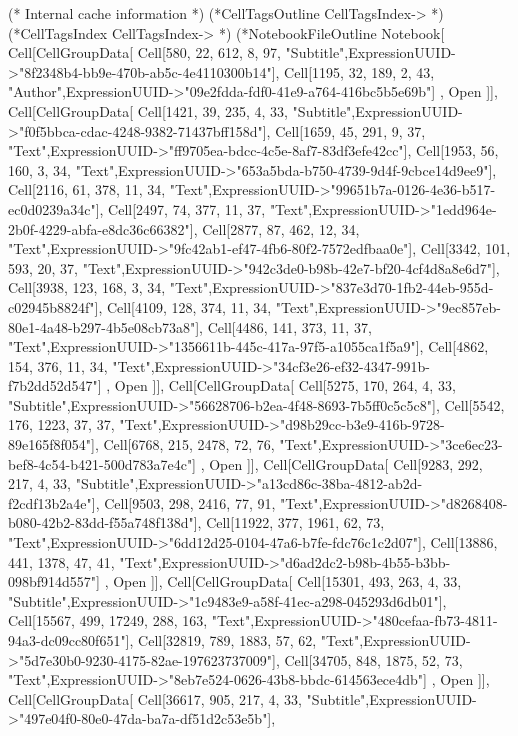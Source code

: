 (* Internal cache information *)
(*CellTagsOutline
CellTagsIndex->{}
*)
(*CellTagsIndex
CellTagsIndex->{}
*)
(*NotebookFileOutline
Notebook[{
Cell[CellGroupData[{
Cell[580, 22, 612, 8, 97, "Subtitle",ExpressionUUID->"8f2348b4-bb9e-470b-ab5c-4e4110300b14"],
Cell[1195, 32, 189, 2, 43, "Author",ExpressionUUID->"09e2fdda-fdf0-41e9-a764-416bc5b5e69b"]
}, Open  ]],
Cell[CellGroupData[{
Cell[1421, 39, 235, 4, 33, "Subtitle",ExpressionUUID->"f0f5bbca-cdac-4248-9382-71437bff158d"],
Cell[1659, 45, 291, 9, 37, "Text",ExpressionUUID->"ff9705ea-bdcc-4c5e-8af7-83df3efe42cc"],
Cell[1953, 56, 160, 3, 34, "Text",ExpressionUUID->"653a5bda-b750-4739-9d4f-9cbce14d9ee9"],
Cell[2116, 61, 378, 11, 34, "Text",ExpressionUUID->"99651b7a-0126-4e36-b517-ec0d0239a34c"],
Cell[2497, 74, 377, 11, 37, "Text",ExpressionUUID->"1edd964e-2b0f-4229-abfa-e8dc36c66382"],
Cell[2877, 87, 462, 12, 34, "Text",ExpressionUUID->"9fc42ab1-ef47-4fb6-80f2-7572edfbaa0e"],
Cell[3342, 101, 593, 20, 37, "Text",ExpressionUUID->"942c3de0-b98b-42e7-bf20-4cf4d8a8e6d7"],
Cell[3938, 123, 168, 3, 34, "Text",ExpressionUUID->"837e3d70-1fb2-44eb-955d-c02945b8824f"],
Cell[4109, 128, 374, 11, 34, "Text",ExpressionUUID->"9ec857eb-80e1-4a48-b297-4b5e08cb73a8"],
Cell[4486, 141, 373, 11, 37, "Text",ExpressionUUID->"1356611b-445c-417a-97f5-a1055ca1f5a9"],
Cell[4862, 154, 376, 11, 34, "Text",ExpressionUUID->"34cf3e26-ef32-4347-991b-f7b2dd52d547"]
}, Open  ]],
Cell[CellGroupData[{
Cell[5275, 170, 264, 4, 33, "Subtitle",ExpressionUUID->"56628706-b2ea-4f48-8693-7b5ff0c5c5c8"],
Cell[5542, 176, 1223, 37, 37, "Text",ExpressionUUID->"d98b29cc-b3e9-416b-9728-89e165f8f054"],
Cell[6768, 215, 2478, 72, 76, "Text",ExpressionUUID->"3ce6ec23-bef8-4c54-b421-500d783a7e4c"]
}, Open  ]],
Cell[CellGroupData[{
Cell[9283, 292, 217, 4, 33, "Subtitle",ExpressionUUID->"a13cd86c-38ba-4812-ab2d-f2cdf13b2a4e"],
Cell[9503, 298, 2416, 77, 91, "Text",ExpressionUUID->"d8268408-b080-42b2-83dd-f55a748f138d"],
Cell[11922, 377, 1961, 62, 73, "Text",ExpressionUUID->"6dd12d25-0104-47a6-b7fe-fdc76c1c2d07"],
Cell[13886, 441, 1378, 47, 41, "Text",ExpressionUUID->"d6ad2dc2-b98b-4b55-b3bb-098bf914d557"]
}, Open  ]],
Cell[CellGroupData[{
Cell[15301, 493, 263, 4, 33, "Subtitle",ExpressionUUID->"1c9483e9-a58f-41ec-a298-045293d6db01"],
Cell[15567, 499, 17249, 288, 163, "Text",ExpressionUUID->"480cefaa-fb73-4811-94a3-dc09cc80f651"],
Cell[32819, 789, 1883, 57, 62, "Text",ExpressionUUID->"5d7e30b0-9230-4175-82ae-197623737009"],
Cell[34705, 848, 1875, 52, 73, "Text",ExpressionUUID->"8eb7e524-0626-43b8-bbdc-614563ece4db"]
}, Open  ]],
Cell[CellGroupData[{
Cell[36617, 905, 217, 4, 33, "Subtitle",ExpressionUUID->"497e04f0-80e0-47da-ba7a-df51d2c53e5b"],
}}
